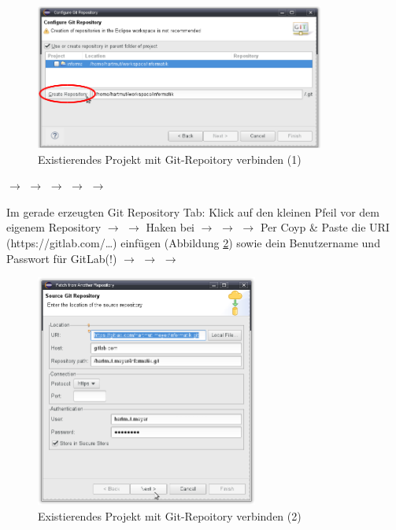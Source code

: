\begin{compactenum}
\begin{figure}[h]
  \centering
   \includegraphics[width=0.85\textwidth]{./inf/SEKII/01_Vorbereitung/Connect_to_Repository_1.png}
   \caption{Existierendes Projekt mit Git-Repoitory verbinden (1)}
   \label{fig:connect_to_repository_1}
\end{figure}

\item {} $\rightarrow$  $\rightarrow$
 $\rightarrow$  $\rightarrow$  $\rightarrow$ 

\item Im gerade erzeugten Git Repository Tab: Klick auf den kleinen Pfeil vor
dem eigenem Repository $\rightarrow$  $\rightarrow$  Haken bei  $\rightarrow$  
$\rightarrow$  $\rightarrow$ Per Coyp \& Paste die URI
(https://gitlab.com/\ldots) einfügen (Abbildung
\ref{fig:connect_to_repository_2}) sowie dein Benutzername und Passwort für
GitLab(!) $\rightarrow$  $\rightarrow$
 $\rightarrow$ 

\begin{figure}[h]
  \centering
   \includegraphics[width=0.65\textwidth]{./inf/SEKII/01_Vorbereitung/Connect_to_Repository_2.png}
   \caption{Existierendes Projekt mit Git-Repoitory verbinden (2)}
   \label{fig:connect_to_repository_2}
\end{figure}


\end{compactenum}
